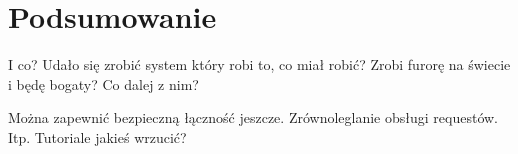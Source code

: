 \chapter{Podsumowanie}
I co? Udało się zrobić system który robi to, co miał robić? Zrobi furorę na świecie i będę bogaty?
Co dalej z nim?

Można zapewnić bezpieczną łączność jeszcze.
Zrównoleglanie obsługi requestów. Itp.
Tutoriale jakieś wrzucić?
